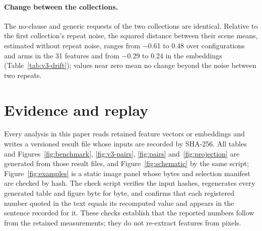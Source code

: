 




\paragraph{Change between the collections.} The no-clause and generic requests of the two
collections are identical. Relative to the first collection's repeat noise, the squared distance
between their scene means, estimated without repeat noise, ranges from $-$0.61 to 0.48 over
configurations and arms in the 31 features and from $-$0.29 to 0.24 in the embeddings
(Table~\ref{tab:v3-drift}); values near zero mean no change beyond the noise between two repeats.



\FloatBarrier
\section{Evidence and replay}\label{app:replay}

Every analysis in this paper reads retained feature vectors or embeddings and writes a versioned
result file whose inputs are recorded by SHA-256. All tables and Figures~\ref{fig:benchmark}, \ref{fig:v3-pairs}, \ref{fig:pairs}
and~\ref{fig:projection} are generated from those result files, and Figure~\ref{fig:schematic} by
the same script; Figure~\ref{fig:examples} is a static image panel whose bytes and selection manifest are
checked by hash. The check script verifies the input hashes, regenerates every generated table and
figure byte for byte, and confirms that each registered number quoted in the text equals its
recomputed value and appears in the sentence recorded for it. These checks establish that the
reported numbers follow from the retained measurements; they do not re-extract features from
pixels.
